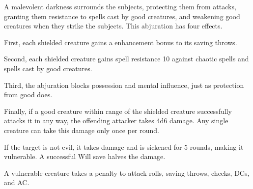\begin{comment}
\subsubsection{U-Z}
\end{comment}

\begin{spelleffect}
  A malevolent darkness surrounds the subjects, protecting them from attacks, granting them resistance to spells cast by good creatures, and weakening good creatures when they strike the subjects. This abjuration has four effects.
  \par First, each shielded creature gains a  enhancement bonus to its saving throws.
  \par Second, each shielded creature gains spell resistance 10 against chaotic spells and spells cast by good creatures.
  \par Third, the abjuration blocks possession and mental influence, just as protection from good does.
  \par Finally, if a good creature within \rngmed range of the shielded creature successfully attacks it in any way, the offending attacker takes 4d6 damage. Any single creature can take this damage only once per round.
\end{spelleffect}

\spellrng{\rngmed}
\begin{spelleffect}
  If the target is not evil, it takes damage and is sickened for 5 rounds, making it vulnerable. A successful Will save halves the damage.
\end{spelleffect}
\begin{spellnotes}
  A vulnerable creature takes a  penalty to attack rolls, saving throws, checks, DCs, and AC.
\end{spellnotes}

